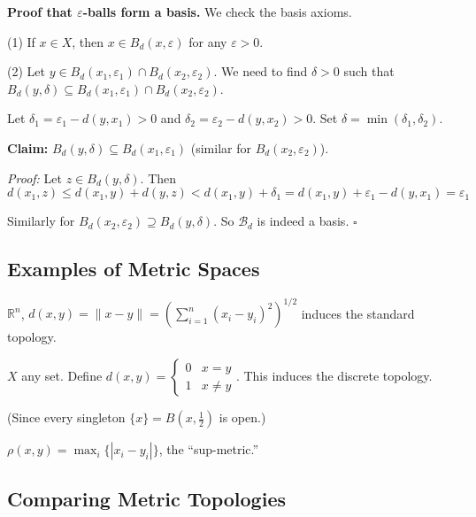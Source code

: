 \documentclass[11pt]{report}
\renewenvironment{proof}[1][Proof]{\noindent\textbf{#1.} }{\hfill$\square$\par\vspace{5pt}}
\begin{document}
\begin{proof}[Proof that $\varepsilon$-balls form a basis]
We check the basis axioms.

(1) If $x \in X$, then $x \in B_d(x, \varepsilon)$ for any $\varepsilon > 0$. \checkmark

(2) Let $y \in B_d(x_1, \varepsilon_1) \cap B_d(x_2, \varepsilon_2)$. We need to find $\delta > 0$ such that $B_d(y, \delta) \subseteq B_d(x_1, \varepsilon_1) \cap B_d(x_2, \varepsilon_2)$.

Let $\delta_1 = \varepsilon_1 - d(y, x_1) > 0$ and $\delta_2 = \varepsilon_2 - d(y, x_2) > 0$. Set $\delta = \min(\delta_1, \delta_2)$.

\textbf{Claim:} $B_d(y, \delta) \subseteq B_d(x_1, \varepsilon_1)$ (similar for $B_d(x_2, \varepsilon_2)$).

\textit{Proof:} Let $z \in B_d(y, \delta)$. Then 
\[d(x_1, z) \leq d(x_1, y) + d(y, z) < d(x_1, y) + \delta_1 = d(x_1, y) + \varepsilon_1 - d(y, x_1) = \varepsilon_1\]

Similarly for $B_d(x_2, \varepsilon_2) \supseteq B_d(y, \delta)$. So $\mathcal{B}_d$ is indeed a basis.
\end{proof}

\subsection{Examples of Metric Spaces}

\begin{exbox}
$\mathbb{R}^n$, $d(x,y) = \|x - y\| = \left(\sum_{i=1}^{n}(x_i - y_i)^2\right)^{1/2}$ induces the standard topology.
\end{exbox}

\begin{exbox}
$X$ any set. Define $d(x,y) = \begin{cases} 0 & x = y \\ 1 & x \neq y \end{cases}$. This induces the discrete topology.

(Since every singleton $\{x\} = B(x, \frac{1}{2})$ is open.)
\end{exbox}

\begin{exbox}
$\rho(x,y) = \max_i\{|x_i - y_i|\}$, the ``sup-metric.''
\end{exbox}

\subsection{Comparing Metric Topologies}
\end{document}

